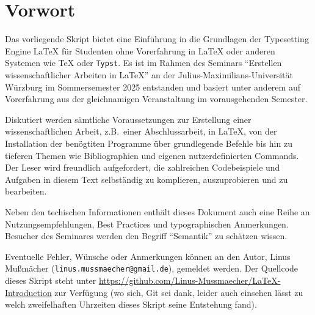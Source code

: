 \documentclass[
	11pt,
	ngerman,
]{scrbook}
\begin{document}
	\frontmatter

	

	\chapter{Vorwort}

	Das vorliegende Skript bietet eine Einführung in die Grundlagen der Typesetting Engine \LaTeX{} für Studenten ohne Vorerfahrung in \LaTeX{} oder anderen Systemen wie \TeX{} oder \texttt{Typst}.
	Es ist im Rahmen des Seminars \enquote{Erstellen wissenschaftlicher Arbeiten in \LaTeX{}} an der Julius-Maximilians-Universität Würzburg im Sommersemester 2025 entstanden und basiert unter anderem auf Vorerfahrung aus der gleichnamigen Veranstaltung im vorausgehenden Semester.

	Diskutiert werden sämtliche Voraussetzungen zur Erstellung einer wissenschaftlichen Arbeit, z.B.\ einer Abschlussarbeit, in \LaTeX{}, von der Installation der benögtiten Programme über grundlegende Befehle bis hin zu tieferen Themen wie Bibliographien und eigenen nutzerdefinierten Commands.
	Der Leser wird freundlich aufgefordert, die zahlreichen Codebeispiele und Aufgaben in diesem Text selbständig zu komplieren, auszuprobieren und zu bearbeiten.

	Neben den techischen Informationen enthält dieses Dokument auch eine Reihe an Nutzungsempfehlungen, Best Practices und typographischen Anmerkungen.
	Besucher des Seminares werden den Begriff \enquote{Semantik} zu schätzen wissen.

	Eventuelle Fehler, Wünsche oder Anmerkungen können an den Autor, Linus Mußmächer (\texttt{linus.mussmaecher@gmail.de}), gemeldet werden.
	Der Quellcode dieses Skript steht unter \url{https://github.com/Linus-Mussmaecher/LaTeX-Introduction} zur Verfügung (wo sich, Git sei dank, leider auch einsehen lässt zu welch zweifelhaften Uhrzeiten dieses Skript seine Entstehung fand).

	

	\newpage

	\setcounter{tocdepth}{1}
	\tableofcontents


	\mainmatter

	
	
	
	\backmatter

	\printbibliography
	
\end{document}
